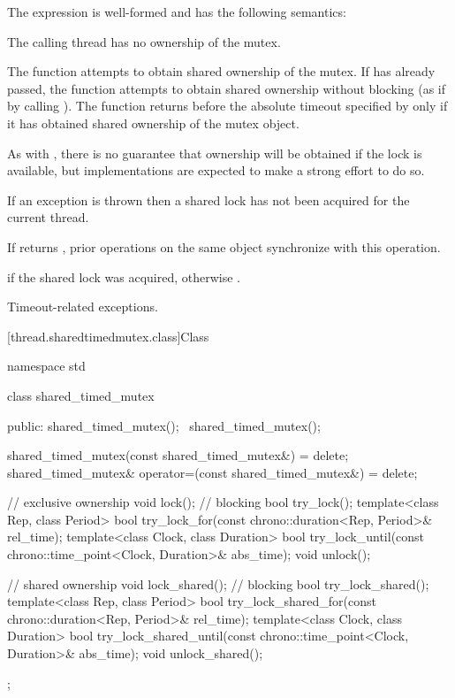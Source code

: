 \pnum
The expression  is well-formed
and has the following semantics:

\begin{itemdescr}
\pnum
\expects
The calling thread has no ownership of the mutex.

\pnum
\effects
The function attempts to obtain shared ownership of the mutex. If
 has already passed, the function attempts to obtain shared
ownership without blocking (as if by calling ). The
function returns before the absolute timeout
specified by  only if it has obtained shared ownership of the
mutex object.
\begin{note}
As with , there is no guarantee that
ownership will be obtained if the lock is available, but implementations are
expected to make a strong effort to do so.
\end{note}
If an exception is thrown then a shared lock has not been acquired for
the current thread.

\pnum
\sync
If  returns , prior
 operations on the same object synchronize
with this operation.

\pnum
\result
{}

\pnum
\returns
{} if the shared lock was acquired, otherwise .

\pnum
\throws
Timeout-related exceptions.
\end{itemdescr}

[thread.sharedtimedmutex.class]{Class }

%
\begin{codeblock}
namespace std {
  class shared_timed_mutex {
  public:
    shared_timed_mutex();
    ~shared_timed_mutex();

    shared_timed_mutex(const shared_timed_mutex&) = delete;
    shared_timed_mutex& operator=(const shared_timed_mutex&) = delete;

    // exclusive ownership
    void lock();                // blocking
    bool try_lock();
    template<class Rep, class Period>
      bool try_lock_for(const chrono::duration<Rep, Period>& rel_time);
    template<class Clock, class Duration>
      bool try_lock_until(const chrono::time_point<Clock, Duration>& abs_time);
    void unlock();

    // shared ownership
    void lock_shared();         // blocking
    bool try_lock_shared();
    template<class Rep, class Period>
      bool try_lock_shared_for(const chrono::duration<Rep, Period>& rel_time);
    template<class Clock, class Duration>
      bool try_lock_shared_until(const chrono::time_point<Clock, Duration>& abs_time);
    void unlock_shared();
  };
}
\end{codeblock}

